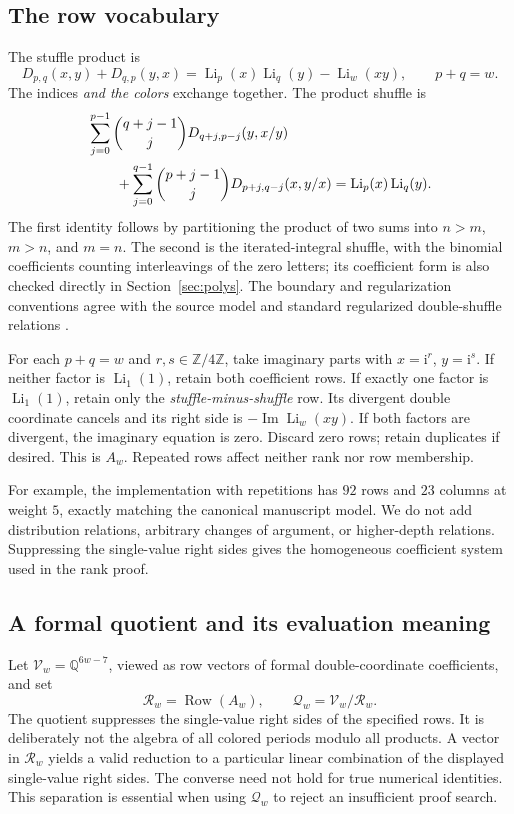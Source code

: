 \documentclass[11pt,a4paper]{article}
\numberwithin{equation}{section}
\theoremstyle{definition}\newtheorem{definition}[theorem]{Definition}
\theoremstyle{remark}\newtheorem{remark}[theorem]{Remark}
\newcommand{\Q}{\mathbb Q}
\newcommand{\Z}{\mathbb Z}
\newcommand{\ii}{\mathrm i}
\newcommand{\Li}{\operatorname{Li}}
\newcommand{\Imag}{\operatorname{Im}}
\newcommand{\Row}{\operatorname{Row}}
\newcommand{\V}{\mathcal V}
\newcommand{\R}{\mathcal R}
\begin{document}
\subsection{The row vocabulary}
The stuffle product is
\begin{equation}
D_{p,q}(x,y)+D_{q,p}(y,x)
 =\Li_p(x)\Li_q(y)-\Li_w(xy),\qquad p+q=w.
\label{eq:stuffle}
\end{equation}
The indices \emph{and the colors} exchange together. The product shuffle is
\begin{align}
&\sum_{j=0}^{p-1}\binom{q+j-1}{j}
       D_{q+j,p-j}(y,x/y)\notag\\
&\qquad+\sum_{j=0}^{q-1}\binom{p+j-1}{j}
       D_{p+j,q-j}(x,y/x)
 =\Li_p(x)\Li_q(y).
\label{eq:shuffle}
\end{align}
The first identity follows by partitioning the product of two sums into
$n>m$, $m>n$, and $m=n$. The second is the iterated-integral shuffle, with the
binomial coefficients counting interleavings of the zero letters; its
coefficient form is also checked directly in Section~\ref{sec:polys}.
The boundary and regularization conventions agree with the source model
and standard regularized double-shuffle relations \cite{repo,zhao}.

For each $p+q=w$ and $r,s\in\Z/4\Z$, take imaginary parts with
$x=\ii^r$, $y=\ii^s$. If neither factor is $\Li_1(1)$, retain both coefficient
rows. If exactly one factor is $\Li_1(1)$, retain only the
\emph{stuffle-minus-shuffle} row. Its divergent double coordinate cancels and
its right side is $-\Imag\Li_w(xy)$. If both factors are divergent, the
imaginary equation is zero. Discard zero rows; retain duplicates if desired.
This is $A_w$. Repeated rows affect neither rank nor row membership.

For example, the implementation with repetitions has $92$ rows and $23$
columns at weight $5$, exactly matching the canonical manuscript model.
We do not add distribution relations, arbitrary changes of argument, or
higher-depth relations. Suppressing the single-value right sides gives the
homogeneous coefficient system used in the rank proof.

\subsection{A formal quotient and its evaluation meaning}
Let $\V_w=\Q^{6w-7}$, viewed as row vectors of formal double-coordinate
coefficients, and set
\[
\R_w=\Row(A_w),\qquad \mathcal Q_w=\V_w/\R_w.
\]
The quotient suppresses the single-value right sides of the specified rows.
It is deliberately not the algebra of all colored periods modulo all
products. A vector in $\R_w$ yields a valid reduction to a particular linear
combination of the displayed single-value right sides. The converse need not
hold for true numerical identities. This separation is essential when using
$\mathcal Q_w$ to reject an insufficient proof search.
\end{document}
